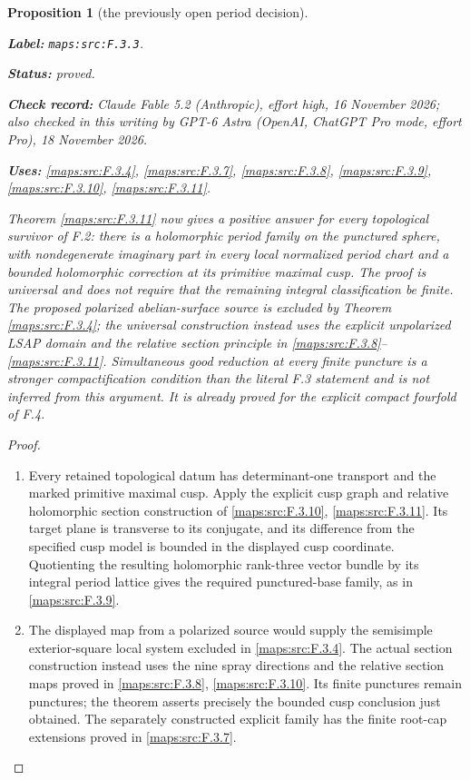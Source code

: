 \documentclass[11pt,a4paper]{article}
\newtheorem{proposition}[proposition]{Proposition}
\theoremstyle{definition}
\newcommand{\StatementRecord}[4]{\par\smallskip\begingroup\upshape\raggedright\noindent\textbf{Label:} \nolinkurl{#1}.\par\noindent\textbf{Status:} #2.\par\noindent\textbf{Check record:} #3.\par\noindent\textbf{Uses:} #4.\par\endgroup\smallskip}
\newcommand{\CurrentChecker}{GPT-6 Astra (OpenAI, ChatGPT Pro mode, effort Pro), 18 November 2026}
\begin{document}
\begin{proposition}[the previously open period decision]\label{maps:src:F.3.3}
\StatementRecord{maps:src:F.3.3}{proved}{Claude Fable 5.2 (Anthropic), effort high, 16 November 2026; also checked in this writing by \CurrentChecker}{\cref{maps:src:F.3.4}, \cref{maps:src:F.3.7}, \cref{maps:src:F.3.8}, \cref{maps:src:F.3.9}, \cref{maps:src:F.3.10}, \cref{maps:src:F.3.11}}


Theorem \ref{maps:src:F.3.11} now gives a positive answer for every topological
survivor of F.2: there is a holomorphic period family on the
punctured sphere, with nondegenerate imaginary part in every
local normalized period chart and a bounded holomorphic
correction at its primitive maximal cusp.  The proof is universal
and does not require that the remaining integral classification
be finite.  The proposed polarized abelian-surface source is
excluded by Theorem \ref{maps:src:F.3.4}; the universal construction instead
uses the explicit unpolarized LSAP domain and the relative
section principle in \ref{maps:src:F.3.8}--\ref{maps:src:F.3.11}.  Simultaneous good reduction
at every finite puncture is a stronger compactification condition
than the literal F.3 statement and is not inferred from this
argument.  It is already proved for the explicit compact
fourfold of F.4.

\end{proposition}
\begin{proof}
\begin{enumerate}[label=\arabic*.]
\item Every retained topological datum has determinant-one transport
and the marked primitive maximal cusp. Apply the explicit cusp graph
and relative holomorphic section construction of
\cref{maps:src:F.3.10}, \cref{maps:src:F.3.11}. Its target plane is transverse
to its conjugate, and its difference from the specified cusp model is
bounded in the displayed cusp coordinate. Quotienting the resulting
holomorphic rank-three vector bundle by its integral period lattice
gives the required punctured-base family, as in \cref{maps:src:F.3.9}.
\item The displayed map from a polarized source would supply the
semisimple exterior-square local system excluded in
\cref{maps:src:F.3.4}. The actual section construction instead uses
the nine spray directions and the relative section maps proved in
\cref{maps:src:F.3.8}, \cref{maps:src:F.3.10}. Its finite punctures remain
punctures; the theorem asserts precisely the bounded cusp conclusion
just obtained. The separately constructed explicit family has the
finite root-cap extensions proved in \cref{maps:src:F.3.7}.
\end{enumerate}
\end{proof}
\end{document}
